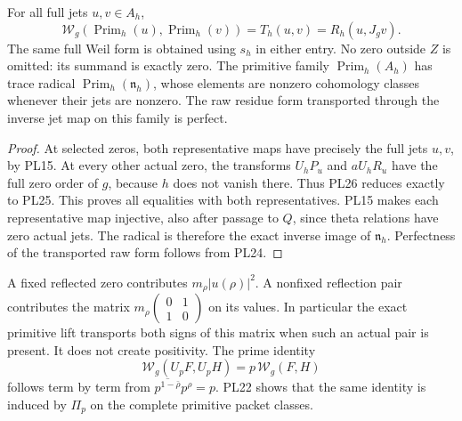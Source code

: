 \begin{theorem}
\label{pl:thm:pairing}
For all full jets \(u,v\in A_h\),
\[
 \mathcal W_g(\operatorname{Prim}_h(u),\operatorname{Prim}_h(v))
 =T_h(u,v)=R_h(u,J_gv).
 \tag{PL27}\label{pl:pl:pullback}
\]
The same full Weil form is obtained using \(s_h\) in either entry.
No zero outside \(Z\) is omitted: its summand is exactly zero.
The primitive family \(\operatorname{Prim}_h(A_h)\) has trace
radical \(\operatorname{Prim}_h(\mathfrak n_h)\), whose elements
are nonzero cohomology classes whenever their jets are nonzero.
The raw residue form transported through the inverse jet map on
this family is perfect.
\end{theorem}
\begin{proof}
At selected zeros, both representative maps have precisely the full
jets \(u,v\), by PL15. At every other actual zero, the transforms
\(U_hP_u\) and \(aU_hR_u\) have the full zero order of \(g\), because
\(h\) does not vanish there. Thus PL26 reduces exactly to PL25.
This proves all equalities with both representatives.
PL15 makes each representative map injective, also after passage to
\(Q\), since theta relations have zero actual jets. The radical is
therefore the exact inverse image of \(\mathfrak n_h\).
Perfectness of the transported raw form follows from PL24.
\end{proof}

A fixed reflected zero contributes \(m_\rho|u(\rho)|^2\).
A nonfixed reflection pair contributes the matrix
\(m_\rho\left(\begin{smallmatrix}0&1\\1&0\end{smallmatrix}\right)\)
on its values. In particular the exact primitive lift transports
both signs of this matrix when such an actual pair is present.
It does not create positivity. The prime identity
\[
 \mathcal W_g(U_pF,U_pH)=p\,\mathcal W_g(F,H)
 \tag{PL28}
\]
follows term by term from
\(\overline{p^{1-\bar\rho}}p^\rho=p\).
PL22 shows that the same identity is induced by \(\Pi_p\) on
the complete primitive packet classes.

